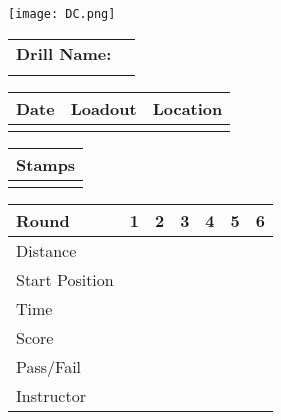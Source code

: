 \documentclass[../Cover.tex]{subfiles}
\begin{document}
	\begin{minipage}[t][0.15\textheight][t]{0.1\textwidth} 
		\texttt{[image: DC.png]}
	\end{minipage}
	\hfill
	\begin{minipage}[t][0.15\textheight][t]{0.8\textwidth}
		\begin{tabular}{ p{} l  }			
			\textbf{Drill Name:} \\
			\\[0.08\textheight]
			\hline
		\end{tabular}
		\quad
		\begin{tabular}{ | p{} | p{} | p{} |}
			\hline
			Date & Loadout & Location\\ 
			\hline
			&  &  \\ 
			\hline
		\end{tabular}
	\end{minipage}
	
	\begin{tabular}{p{}|}
		Stamps \\
		\hline
		\\[0.65\textheight]
	\end{tabular}
	\quad
	\begin{tabular}{ | p{} | p{} | p{} | p{} | p{} | p{} | p{} |}
		\hline
		Round & 1 & 2 & 3 & 4 & 5 & 6 \\
		\hline
		\tiny Distance & & & & & & \\[0.05\textheight]
		\hline
		\tiny Start Position & & & & & & \\[0.05\textheight]
		\hline
		\tiny Time & & & & & & \\[0.05\textheight]
		\hline
		\tiny Score & & & & & & \\[0.05\textheight]
		\hline
		\tiny Pass/Fail & & & & & & \\[0.05\textheight]
		\hline
		\tiny Instructor & & & & & & \\[0.05\textheight]
		\hline
	\end{tabular}
\end{document}
